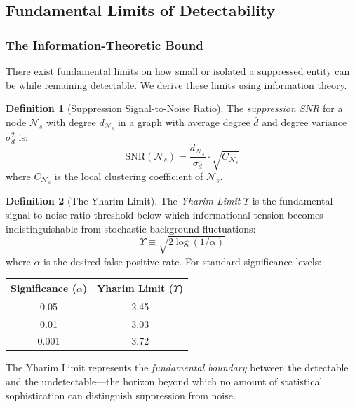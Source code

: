 \documentclass[12pt,a4paper]{article}
\theoremstyle{definition}
\newtheorem{definition}{Definition}[section]
\theoremstyle{remark}
\newcommand{\NS}{\mathcal{N}_s}          %
\newcommand{\Yharim}{\Upsilon}           %
\begin{document}
\subsection{Fundamental Limits of Detectability}

\subsubsection{The Information-Theoretic Bound}

There exist fundamental limits on how small or isolated a suppressed entity can be while remaining detectable. We derive these limits using information theory.

\begin{definition}[Suppression Signal-to-Noise Ratio]
The \emph{suppression SNR} for a node $\NS$ with degree $d_{\NS}$ in a graph with average degree $\bar{d}$ and degree variance $\sigma_d^2$ is:
\begin{equation}
    \text{SNR}(\NS) = \frac{d_{\NS}}{\sigma_d} \cdot \sqrt{C_{\NS}}
\end{equation}
where $C_{\NS}$ is the local clustering coefficient of $\NS$.
\end{definition}

\begin{definition}[The Yharim Limit]
\label{def:yharim}
The \emph{Yharim Limit} $\Yharim$ is the fundamental signal-to-noise ratio threshold below which informational tension becomes indistinguishable from stochastic background fluctuations:
\begin{equation}
    \boxed{
    \Yharim \equiv \sqrt{2 \log(1/\alpha)}
    }
\end{equation}
where $\alpha$ is the desired false positive rate. For standard significance levels:
\begin{center}
\renewcommand{\arraystretch}{1.2}
\begin{tabular}{cc}
\toprule
\textbf{Significance} ($\alpha$) & \textbf{Yharim Limit} ($\Yharim$) \\
\midrule
0.05 & 2.45 \\
0.01 & 3.03 \\
0.001 & 3.72 \\
\bottomrule
\end{tabular}
\end{center}
The Yharim Limit represents the \emph{fundamental boundary} between the detectable and the undetectable---the horizon beyond which no amount of statistical sophistication can distinguish suppression from noise.
\end{definition}
\end{document}
